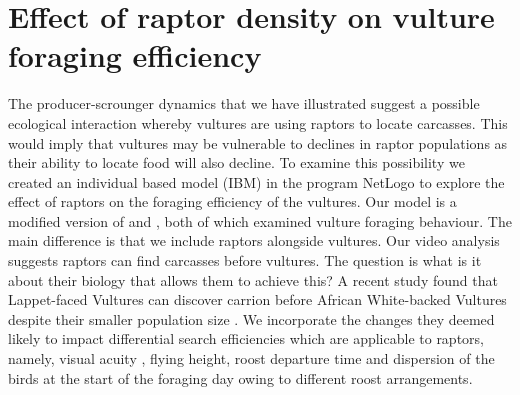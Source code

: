 
\section{\uppercase{E}ffect of raptor density on vulture foraging efficiency}

The producer-scrounger dynamics that we have illustrated suggest a possible ecological interaction whereby vultures are using raptors to locate carcasses. This would imply that vultures may be vulnerable to declines in raptor populations as their ability to locate food will also decline. To examine this possibility we created an individual based model (IBM) in the program NetLogo \citep{tisue2004netlogo} to explore the effect of raptors on the foraging efficiency of the vultures. Our model is a modified version of \cite{jackson2008effect} and \cite{jackson2011evolutionary}, both of which examined vulture foraging behaviour. The main difference is that we include raptors alongside vultures. 
Our video analysis suggests raptors can find carcasses before vultures. The question is what is it about their biology that allows them to achieve this? A recent study found that Lappet-faced Vultures can discover carrion before African White-backed Vultures despite their smaller population size \citep{spiegel2013factors}. We incorporate the changes they deemed likely to impact differential search efficiencies which are applicable to raptors, namely, visual acuity \citep{howland2004allometry}, flying height, roost departure time and dispersion of the birds at the start of the foraging day owing to different roost arrangements. 

